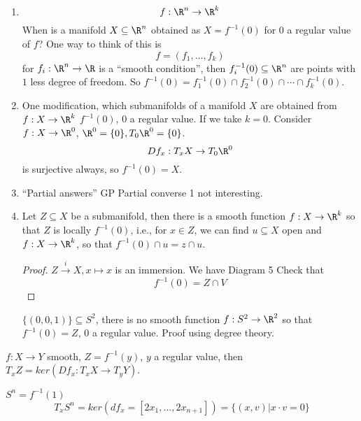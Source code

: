  \begin{enumerate}[(1)]
    \item $$f:\R^n\to \R^k$$
    When is a manifold $X \subseteq \R^n $ obtained as $X=f^{-1}(0)$ for $0$ a regular value of $f$?
    \newline One way to think of this is
      $$f=(f_1,\dots,f_k)$$
    for $f_i:\R^n\to \R$ is a ``smooth condition'', then $f_i ^{-1}(0)\subseteq \R^n $ are points with $1$ less degree of freedom.
    \newline So $f ^{-1}(0)=f_1 ^{-1}(0)\cap f_2 ^{-1}(0) \cap \cdots \cap f_k ^{-1}(0)$.
    \item One modification, which submanifolds of a manifold $X$ are obtained from $f: X\to \R^k$
    $f ^{-1}(0)$, $0$ a regular value.
    \newline If we take $k=0$. Consider $f:X\to \R^0$, $\R^0=\{0\}, T_0\R^0=\{0\}$.
      $$Df_x:T_xX \to T_0\R^0$$
    is surjective always, so $f ^{-1}(0)=X$.
    \item ``Partial answers''
    \newline GP Partial converse 1 not interesting.
    \item
      \begin{proposition}
        Let $Z\subseteq X$ be a submanifold, then there is a smooth function $f: X \to \R^k$ so that $Z$ is locally $f ^{-1}(0)$, i.e., for $x\in Z$, we can find $u\subseteq X$ open and $f: X \to \R^k$, so that $f ^{-1}(0)\cap u=z\cap u$.
      \end{proposition}
      \begin{proof}
        $Z\xrightarrow{i}X, x\mapsto x$ is an immersion.
        \newline We have
        \newline Diagram 5
        \newline Check that
          $$f ^{-1}(0)=Z\cap V$$
      \end{proof}
      \begin{example}
        $\{(0,0,1)\}\subseteq S^2$, there is no smooth function $f: S^2 \to \R^2$ so that $f ^{-1}(0)=Z$, $0$ a regular value.
        \newline Proof using degree theory.
      \end{example}
  \end{enumerate}

\begin{proposition}
  $f: X \to Y$ smooth, $Z=f ^{-1}(y)$, $y$ a regular value, then $T_xZ=ker(Df_x:T_xX\to T_yY)$.
\end{proposition}
\begin{example}
  $S^n=f ^{-1}(1)$
    $$T_xS^n=ker(df_x=[2x_1,\dots,2x_{n+1}])=\{(x,v)| x\cdot v=0\}$$
\end{example}

